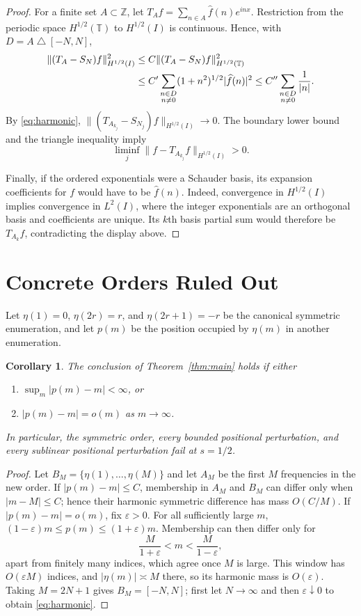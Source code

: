 \documentclass[11pt]{article}
\newtheorem{corollary}{Corollary}
\newcommand{\T}{\mathbb T}
\newcommand{\Z}{\mathbb Z}
\begin{document}
\begin{proof}
For a finite set $A\subset\Z$, let
$T_Af=\sum_{n\in A}\widehat f(n)e^{inx}$.  Restriction from the periodic
space $H^{1/2}(\T)$ to $H^{1/2}(I)$ is continuous.  Hence, with
$D=A\mathbin\triangle[-N,N]$,
\begin{align}
 \|(T_A-S_N)f\|_{H^{1/2}(I)}^2
 &\leq C\|(T_A-S_N)f\|_{H^{1/2}(\T)}^2 \notag\\
 &\leq C'\sum_{\substack{n\in D\\n\ne0}}
 (1+n^2)^{1/2}|\widehat f(n)|^2
 \leq C''\sum_{\substack{n\in D\\n\ne0}}\frac1{|n|}.
 \label{eq:perturb}
\end{align}
By \eqref{eq:harmonic},
$\|(T_{A_{k_j}}-S_{N_j})f\|_{H^{1/2}(I)}\to0$.  The boundary lower bound and
the triangle inequality imply
\[
 \liminf_j\|f-T_{A_{k_j}}f\|_{H^{1/2}(I)}>0.
\]

Finally, if the ordered exponentials were a Schauder basis, its expansion
coefficients for $f$ would have to be $\widehat f(n)$.  Indeed, convergence
in $H^{1/2}(I)$ implies convergence in $L^2(I)$, where the integer
exponentials are an orthogonal basis and coefficients are unique.  Its
$k$th basis partial sum would therefore be $T_{A_k}f$, contradicting the
display above.
\end{proof}

\section*{Concrete Orders Ruled Out}

Let $\eta(1)=0$, $\eta(2r)=r$, and $\eta(2r+1)=-r$ be the canonical
symmetric enumeration, and let $p(m)$ be the position occupied by $\eta(m)$
in another enumeration.

\begin{corollary}
The conclusion of Theorem~\ref{thm:main} holds if either
\begin{enumerate}
\item $\sup_m|p(m)-m|<\infty$, or
\item $|p(m)-m|=o(m)$ as $m\to\infty$.
\end{enumerate}
In particular, the symmetric order, every bounded positional perturbation,
and every sublinear positional perturbation fail at $s=1/2$.
\end{corollary}

\begin{proof}
Let $B_M=\{\eta(1),\ldots,\eta(M)\}$ and let $A_M$ be the first $M$
frequencies in the new order.  If $|p(m)-m|\leq C$, membership in $A_M$ and
$B_M$ can differ only when $|m-M|\leq C$; hence their harmonic symmetric
difference has mass $O(C/M)$.  If $|p(m)-m|=o(m)$, fix $\varepsilon>0$.
For all sufficiently large $m$,
$(1-\varepsilon)m\leq p(m)\leq(1+\varepsilon)m$.  Membership can then differ
only for
\[
 \frac{M}{1+\varepsilon}<m<\frac{M}{1-\varepsilon},
\]
apart from finitely many indices, which agree once $M$ is large.  This window
has $O(\varepsilon M)$ indices, and $|\eta(m)|\asymp M$ there, so its harmonic
mass is $O(\varepsilon)$.  Taking $M=2N+1$ gives $B_M=[-N,N]$; first let
$N\to\infty$ and then $\varepsilon\downarrow0$ to obtain
\eqref{eq:harmonic}.
\end{proof}
\end{document}
